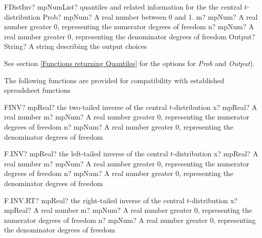 \begin{mpFunctionsExtract}
	\mpFunctionThreeNotImplemented
	{FDistInv? mpNumList? quantiles and related information for the the central $t$-distribution}
	{Prob? mpNum? A real number between 0 and 1.}
	{m? mpNum? A real number greater 0, representing the numerator  degrees of freedom}
	{n? mpNum? A real number greater 0, representing the denominator degrees of freedom}
	{Output? String? A string describing the output choices}
\end{mpFunctionsExtract}

See section \ref{Functions returning Quantiles} for the options for  {\itshape\sffamily Prob} and {\itshape\sffamily Output}). 

\vspace{0.3cm}

The following functions are provided for compatibility with established spreadsheet functions

\vspace{0.3cm}
\begin{mpFunctionsExtract}
	\mpWorksheetFunctionThreeNotImplemented
	{FINV? mpReal? the two-tailed inverse of the central $t$-distribution}
	{x? mpReal? A real number}
	{m? mpNum? A real number greater 0, representing the numerator  degrees of freedom}
	{n? mpNum? A real number greater 0, representing the denominator degrees of freedom}
\end{mpFunctionsExtract}

\vspace{0.6cm}
\begin{mpFunctionsExtract}
	\mpWorksheetFunctionThreeNotImplemented
	{F.INV? mpReal? the left-tailed inverse of the central $t$-distribution}
	{x? mpReal? A real number}
	{m? mpNum? A real number greater 0, representing the numerator  degrees of freedom}
	{n? mpNum? A real number greater 0, representing the denominator degrees of freedom}
\end{mpFunctionsExtract}

\vspace{0.6cm}
\begin{mpFunctionsExtract}
	\mpWorksheetFunctionThreeNotImplemented
	{F.INV.RT? mpReal? the right-tailed inverse of the central $t$-distribution}
	{x? mpReal? A real number}
	{m? mpNum? A real number greater 0, representing the numerator  degrees of freedom}
	{n? mpNum? A real number greater 0, representing the denominator degrees of freedom}
\end{mpFunctionsExtract}


